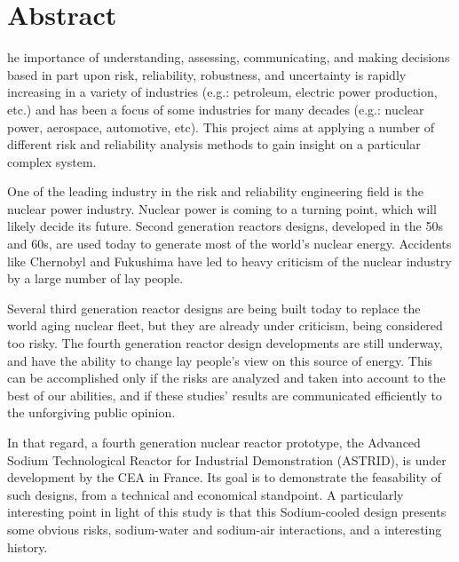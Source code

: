 %
%
%

\chapter*{Abstract}
\begin{SingleSpace}
he importance of understanding, assessing, communicating, and making decisions based in part upon risk, reliability, robustness, and uncertainty is rapidly increasing in a variety of industries (e.g.: petroleum, electric power production, etc.) and has been a focus of some industries for many decades (e.g.: nuclear power, aerospace, automotive, etc). This project aims at applying a number of different risk and reliability analysis methods to gain insight on a particular complex system.

One of the leading industry in the risk and reliability engineering field is the nuclear power industry. Nuclear power is coming to a turning point, which will likely decide its future. Second generation reactors designs, developed in the 50s and 60s, are used today to generate most of the world's nuclear energy. Accidents like Chernobyl and Fukushima have led to heavy criticism of the nuclear industry by a large number of lay people.

Several third generation reactor designs are being built today to replace the world aging nuclear fleet, but they are already under criticism, being considered too risky. The fourth generation reactor design developments are still underway, and have the ability to change lay people's view on this source of energy. This can be accomplished only if the risks are analyzed and taken into account to the best of our abilities, and if these studies' results are communicated efficiently to the unforgiving public opinion.

In that regard, a fourth generation nuclear reactor prototype, the Advanced Sodium Technological Reactor for Industrial Demonstration (ASTRID), is under development by the CEA in France. Its goal is to demonstrate the feasability of such designs, from a technical and economical standpoint. A particularly interesting point in light of this study is that this Sodium-cooled design presents some obvious risks, sodium-water and sodium-air interactions, and a interesting history.
\end{SingleSpace}
\clearpage
